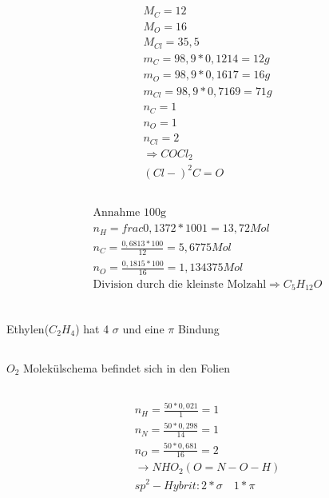 \documentclass[a4paper]{article}
\begin{document}
\subsection{}
\begin{align}
  M_C=12 \\
  M_O=16\\
  M_{Cl}=35,5 \\
  m_C=98,9*0,1214=12g\\
  m_O=98,9*0,1617=16g\\
  m_{Cl}=98,9*0,7169=71g\\
  n_C=1\\
  n_O=1\\
  n_{Cl}=2\\
  \Rightarrow COCl_2\\
  (Cl-)^2C=O
\end{align}

\subsection{}
\begin{align}
  \text{Annahme 100g}\\
  n_H=frac{0,1372*100}{1}=13,72Mol\\
  n_C=\frac{0,6813*100}{12}=5,6775Mol\\
  n_O=\frac{0,1815*100}{16}=1,134375Mol\\
  \text{Division durch die kleinste Molzahl}
  \Rightarrow C_5H_{12}O\\
\end{align}

\subsection{}
  Ethylen($C_2H_4$) hat 4 $\sigma$ und eine $\pi$ Bindung

\subsection{}
  $O_2$ Molekülschema befindet sich in den Folien

\subsection{}
\begin{align}
  n_H=\frac{50*0,021}{1}=1\\
  n_N=\frac{50*0,298}{14}=1\\
  n_O=\frac{50*0,681}{16}=2\\
  \rightarrow NHO_2(O=N-O-H)\\
  sp^2-Hybrit:2*\sigma \quad 1*\pi
\end{align}
\end{document}
